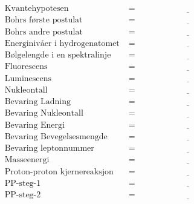 \documentclass{article}
\begin{document}
\begin{align*}
    \text{Kvantehypotesen} &= \underline{\hspace{5cm}} \\
    \text{Bohrs f\o rste postulat} &= \underline{\hspace{5cm}} \\
    \text{Bohrs andre postulat} &= \underline{\hspace{5cm}} \\
    \text{Energiniv\aa er i hydrogenatomet} &= \underline{\hspace{5cm}} \\
    \text{B\o lgelengde i en spektralinje} &= \underline{\hspace{5cm}} \\
    \text{Fluorescens} &= \underline{\hspace{5cm}} \\
    \text{Luminescens} &= \underline{\hspace{5cm}} \\
    \text{Nukleontall} &= \underline{\hspace{5cm}} \\
    \text{Bevaring Ladning} &= \underline{\hspace{5cm}} \\
    \text{Bevaring Nukleontall} &= \underline{\hspace{5cm}} \\
    \text{Bevaring Energi} &= \underline{\hspace{5cm}} \\
    \text{Bevaring Bevegelsesmengde} &= \underline{\hspace{5cm}} \\
    \text{Bevaring leptonnummer} &= \underline{\hspace{5cm}} \\
    \text{Masseenergi} &= \underline{\hspace{5cm}} \\
    \text{Proton-proton kjernereaksjon} &= \underline{\hspace{5cm}} \\
    \text{PP-steg-1} &= \underline{\hspace{5cm}} \\
    \text{PP-steg-2} &= \underline{\hspace{5cm}} \\
\end{align*}
\end{document}
